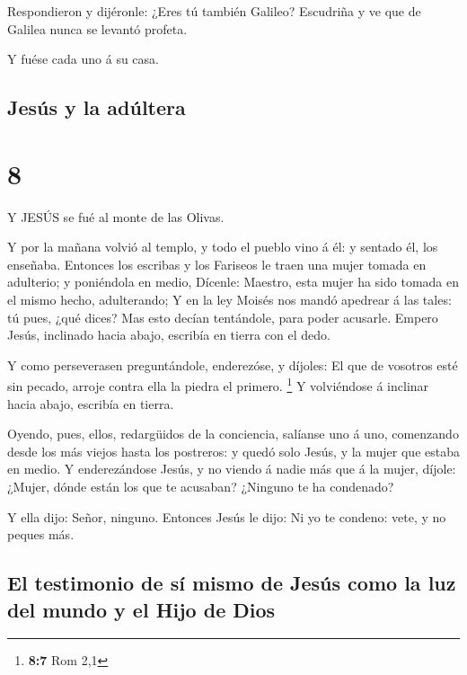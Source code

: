  Respondieron y dijéronle: ¿Eres tú también Galileo?
Escudriña y ve que de Galilea nunca se levantó profeta.

 Y fuése cada uno á su casa.

\hypertarget{jesuxfas-y-la-aduxfaltera}{%
\subsection{Jesús y la adúltera}\label{jesuxfas-y-la-aduxfaltera}}

\hypertarget{section-7}{%
\section{8}\label{section-7}}

 Y JESÚS se fué al monte de las Olivas.

 Y por la mañana volvió al templo, y todo el pueblo vino á
él: y sentado él, los enseñaba.  Entonces los escribas y los
Fariseos le traen una mujer tomada en adulterio; y poniéndola en medio,
 Dícenle: Maestro, esta mujer ha sido tomada en el mismo
hecho, adulterando;  Y en la ley Moisés nos mandó apedrear á
las tales: tú pues, ¿qué dices?  Mas esto decían tentándole,
para poder acusarle. Empero Jesús, inclinado hacia abajo, escribía en
tierra con el dedo.

 Y como perseverasen preguntándole, enderezóse, y díjoles:
El que de vosotros esté sin pecado, arroje contra ella la piedra el
primero. \footnote{\textbf{8:7} Rom 2,1}  Y volviéndose á
inclinar hacia abajo, escribía en tierra.

 Oyendo, pues, ellos, redargüidos de la conciencia, salíanse
uno á uno, comenzando desde los más viejos hasta los postreros: y quedó
solo Jesús, y la mujer que estaba en medio.  Y
enderezándose Jesús, y no viendo á nadie más que á la mujer, díjole:
¿Mujer, dónde están los que te acusaban? ¿Ninguno te ha condenado?

 Y ella dijo: Señor, ninguno. Entonces Jesús le dijo: Ni yo
te condeno: vete, y no peques más.

\hypertarget{el-testimonio-de-suxed-mismo-de-jesuxfas-como-la-luz-del-mundo-y-el-hijo-de-dios}{%
\subsection{El testimonio de sí mismo de Jesús como la luz del mundo y
el Hijo de
Dios}\label{el-testimonio-de-suxed-mismo-de-jesuxfas-como-la-luz-del-mundo-y-el-hijo-de-dios}}

